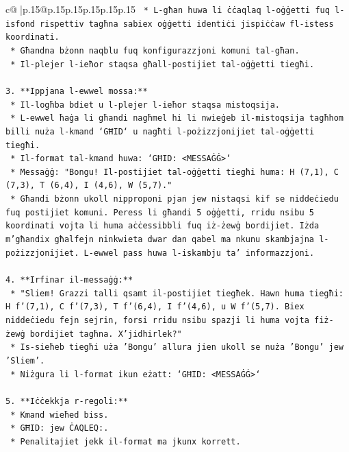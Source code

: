 \documentclass{article}
\begin{document}
{\begin{supertabular}{c@{$\;$}|p{.15\linewidth}@{}p{.15\linewidth}p{.15\linewidth}p{.15\linewidth}p{.15\linewidth}p{.15\linewidth}}
{{{\texttt{    *   L{-}għan huwa li ċċaqlaq l{-}oġġetti fuq l{-}isfond rispettiv tagħna sabiex oġġetti identiċi jispiċċaw fl{-}istess koordinati.} \\
\texttt{    *   Għandna bżonn naqblu fuq konfigurazzjoni komuni tal{-}għan.} \\
\texttt{    *   Il{-}plejer l{-}ieħor staqsa għall{-}postijiet tal{-}oġġetti tiegħi.} \\
\\ 
\texttt{3.  **Ippjana l{-}ewwel mossa:**} \\
\texttt{    *   Il{-}logħba bdiet u l{-}plejer l{-}ieħor staqsa mistoqsija.} \\
\texttt{    *   L{-}ewwel ħaġa li għandi nagħmel hi li nwieġeb il{-}mistoqsija tagħhom billi nuża l{-}kmand `GĦID` u nagħti l{-}pożizzjonijiet tal{-}oġġetti tiegħi.} \\
\texttt{    *   Il{-}format tal{-}kmand huwa: `GĦID: <MESSAĠĠ>`} \\
\texttt{    *   Messaġġ: "Bongu! Il{-}postijiet tal{-}oġġetti tiegħi huma: H (7,1), C (7,3), T (6,4), I (4,6), W (5,7)."} \\
\texttt{    *   Għandi bżonn ukoll nipproponi pjan jew nistaqsi kif se niddeċiedu fuq postijiet komuni. Peress li għandi 5 oġġetti, rridu nsibu 5 koordinati vojta li huma aċċessibbli fuq iż{-}żewġ bordijiet. Iżda m'għandix għalfejn ninkwieta dwar dan qabel ma nkunu skambjajna l{-}pożizzjonijiet. L{-}ewwel pass huwa l{-}iskambju ta' informazzjoni.} \\
\\ 
\texttt{4.  **Irfinar il{-}messaġġ:**} \\
\texttt{    *   "Sliem! Grazzi talli qsamt il{-}postijiet tiegħek. Hawn huma tiegħi: H f'(7,1), C f'(7,3), T f'(6,4), I f'(4,6), u W f'(5,7). Biex niddeċiedu fejn sejrin, forsi rridu nsibu spazji li huma vojta fiż{-}żewġ bordijiet tagħna. X'jidhirlek?"} \\
\texttt{    *   Is{-}sieħeb tiegħi uża 'Bongu' allura jien ukoll se nuża 'Bongu' jew 'Sliem'.} \\
\texttt{    *   Niżgura li l{-}format ikun eżatt: `GĦID: <MESSAĠĠ>`} \\
\\ 
\texttt{5.  **Iċċekkja r{-}regoli:**} \\
\texttt{    *   Kmand wieħed biss.} \\
\texttt{    *   GĦID: jew ĊAQLEQ:.} \\
\texttt{    *   Penalitajiet jekk il{-}format ma jkunx korrett.} \\
}}}
\end{supertabular}}
\end{document}
